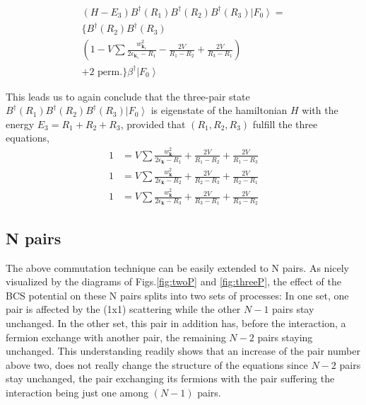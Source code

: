 \documentclass[aps,prb,superscriptaddress,twocolumn]{revtex4}
\begin{document}
\begin{multline}  \label{eq:SchThree4}
(H-E _3)B^{\dagger}(R_1)B^{\dagger}(R_2)B^{\dagger}(R_3)\left|F_0%
\right>  = \\
\{B^{\dagger}(R_2)B^{\dagger}(R_3) \\
\left(1-V\sum\frac{w_{\mathbf{k} _1}^2}{2\epsilon_{\mathbf{k} _1}-R_1}-\frac{2V%
}{R_1-R_2}+\frac{2V}{R_3-R_1}\right)  \\
+\text{2 perm.}\}\beta^{\dagger}\left|F_0\right>  
\end{multline}

This leads us to again conclude that the three-pair state $%
B^{\dagger}(R_1)B^{\dagger}(R_2)B^{\dagger}(R_3)\left|F_0\right>  $ is
eigenstate of the hamiltonian $H$ with the energy $E _3=R_1+R_2+R_3$,
provided that $\left(R_1,R_2, R_3\right) $ fulfill the three equations, 
\begin{equation}
\begin{split}
1&=V\sum\frac{w_{\mathbf{k} }^2}{2\epsilon_{\mathbf{k} }-R_1}+\frac{2V}{R_1-R_2%
}+\frac{2V}{R_1-R_3} \\
1&=V\sum\frac{w_{\mathbf{k} }^2}{2\epsilon_{\mathbf{k} }-R_2}+\frac{2V}{R_2-R_3%
}+\frac{2V}{R_2-R_1} \\
1&=V\sum\frac{w_{\mathbf{k} }^2}{2\epsilon_{\mathbf{k} }-R_3}+\frac{2V}{R_3-R_1%
}+\frac{2V}{R_3-R_2}
\end{split}%
\end{equation}

\subsection{N pairs}

The above commutation technique can be easily extended to N pairs. As nicely
visualized by the diagrams of Figs.\ref{fig:twoP} and \ref{fig:threeP}, the
effect of the BCS potential on these N pairs splits into two sets of processes:
In one set, one pair is affected by the (1x1) scattering while the other $N-1
$ pairs stay unchanged. In the other set, this pair in addition has, before the interaction, a fermion
exchange with another pair, the remaining $N-2$
pairs staying unchanged. This understanding readily shows that an increase of the pair number above two, does not really change the structure of the equations
since $N-2$ pairs stay unchanged, the pair exchanging its fermions with the
pair suffering the interaction being just one among $(N-1)$ pairs.
\end{document}
